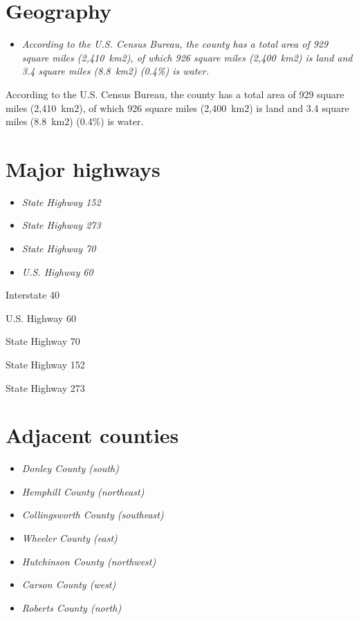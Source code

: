 \section{Geography}\label{geography}

\begin{itemize}
\item
  \emph{According to the U.S. Census Bureau, the county has a total area
  of 929 square miles (2,410~km2), of which 926 square miles (2,400~km2)
  is land and 3.4 square miles (8.8~km2) (0.4\%) is water.}
\end{itemize}

According to the U.S. Census Bureau, the county has a total area of 929
square miles (2,410~km2), of which 926 square miles (2,400~km2) is land
and 3.4 square miles (8.8~km2) (0.4\%) is water.

\section{Major highways}\label{major-highways}

\begin{itemize}
\item
  \emph{State Highway 152}
\item
  \emph{State Highway 273}
\item
  \emph{State Highway 70}
\item
  \emph{U.S. Highway 60}
\end{itemize}

Interstate 40

U.S. Highway 60

State Highway 70

State Highway 152

State Highway 273

\section{Adjacent counties}\label{adjacent-counties}

\begin{itemize}
\item
  \emph{Donley County (south)}
\item
  \emph{Hemphill County (northeast)}
\item
  \emph{Collingsworth County (southeast)}
\item
  \emph{Wheeler County (east)}
\item
  \emph{Hutchinson County (northwest)}
\item
  \emph{Carson County (west)}
\item
  \emph{Roberts County (north)}
\end{itemize}

